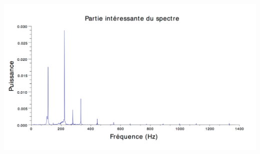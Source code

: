 \documentclass[a4paper,12pt]{report}
\begin{document}
\begin{enumerate}
\begin{center}
		\includegraphics[scale=0.5]{GuitareFreq2.png}\\
	\end{center}	
\end{enumerate}
\newpage
\end{document}
